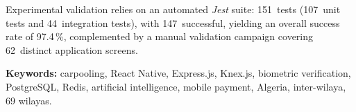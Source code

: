 Experimental validation relies on an automated \textit{Jest} suite: 151~tests (107~unit tests and 44~integration tests), with 147~successful, yielding an overall success rate of 97.4\,\%, complemented by a manual validation campaign covering 62~distinct application screens.

\vspace{0.3cm}
\textbf{Keywords:} carpooling, React Native, Express.js, Knex.js, biometric verification, PostgreSQL, Redis, artificial intelligence, mobile payment, Algeria, inter-wilaya, 69 wilayas.
